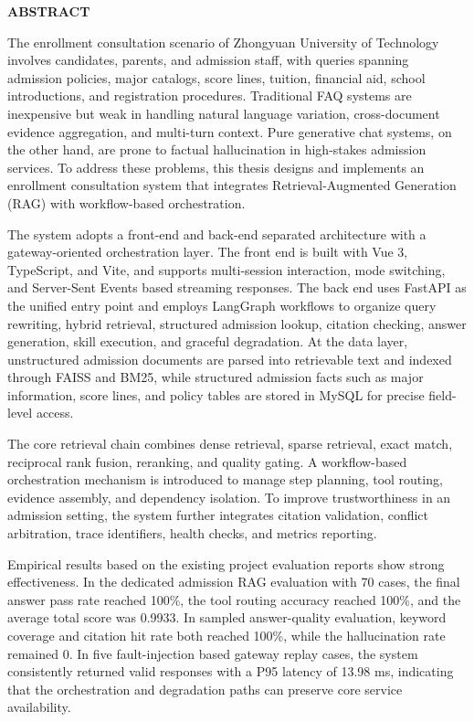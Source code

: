 \documentclass[UTF8,zihao=-4,oneside,fontset=windows]{ctexbook}
\numberwithin{equation}{chapter}
\begin{document}
\clearpage
\begin{center}
  {\arialfont\bfseries\fontsize{15pt}{20pt}\selectfont ABSTRACT\par}
\end{center}
\vspace{1em}
\arialfont\fontsize{12pt}{20pt}\selectfont
The enrollment consultation scenario of Zhongyuan University of Technology involves candidates, parents, and admission staff, with queries spanning admission policies, major catalogs, score lines, tuition, financial aid, school introductions, and registration procedures. Traditional FAQ systems are inexpensive but weak in handling natural language variation, cross-document evidence aggregation, and multi-turn context. Pure generative chat systems, on the other hand, are prone to factual hallucination in high-stakes admission services. To address these problems, this thesis designs and implements an enrollment consultation system that integrates Retrieval-Augmented Generation (RAG) with workflow-based orchestration.

The system adopts a front-end and back-end separated architecture with a gateway-oriented orchestration layer. The front end is built with Vue 3, TypeScript, and Vite, and supports multi-session interaction, mode switching, and Server-Sent Events based streaming responses. The back end uses FastAPI as the unified entry point and employs LangGraph workflows to organize query rewriting, hybrid retrieval, structured admission lookup, citation checking, answer generation, skill execution, and graceful degradation. At the data layer, unstructured admission documents are parsed into retrievable text and indexed through FAISS and BM25, while structured admission facts such as major information, score lines, and policy tables are stored in MySQL for precise field-level access.

The core retrieval chain combines dense retrieval, sparse retrieval, exact match, reciprocal rank fusion, reranking, and quality gating. A workflow-based orchestration mechanism is introduced to manage step planning, tool routing, evidence assembly, and dependency isolation. To improve trustworthiness in an admission setting, the system further integrates citation validation, conflict arbitration, trace identifiers, health checks, and metrics reporting.

Empirical results based on the existing project evaluation reports show strong effectiveness. In the dedicated admission RAG evaluation with 70 cases, the final answer pass rate reached 100\%, the tool routing accuracy reached 100\%, and the average total score was 0.9933. In sampled answer-quality evaluation, keyword coverage and citation hit rate both reached 100\%, while the hallucination rate remained 0. In five fault-injection based gateway replay cases, the system consistently returned valid responses with a P95 latency of 13.98 ms, indicating that the orchestration and degradation paths can preserve core service availability.
\end{document}
